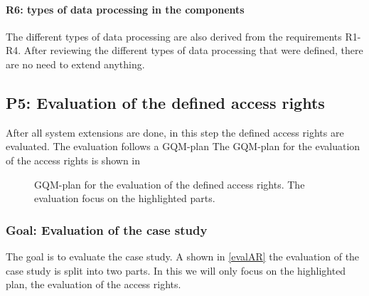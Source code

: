\paragraph{R6: types of data processing in the components}
The different types of data processing are also derived from the requirements R1-R4. After reviewing the different types of data processing that were defined, there are no need to extend anything. 
\subsection{P5: Evaluation of the defined access rights}
After all system extensions are done, in this step  the defined access rights are evaluated. The evaluation follows a GQM-plan %
The GQM-plan for the evaluation of the access rights is shown in
\begin{figure}

\caption{GQM-plan for the evaluation of the defined access rights. The evaluation focus on the highlighted parts.}
\label{evalAR}
\end{figure}
\subsubsection{Goal: Evaluation of the case study}
The goal is to evaluate the case study. A shown in \autoref{evalAR} the evaluation of the case study is split into two parts. In this we will only focus on the highlighted plan, the evaluation of the access rights.
